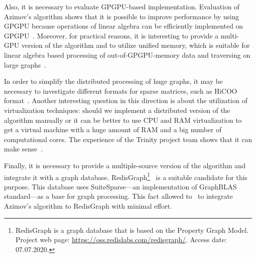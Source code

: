 Also, it is necessary to evaluate GPGPU-based implementation.
Evaluation of Azimov's algorithm shows that it is possible to improve performance by using GPGPU because operations of linear algebra can be efficiently implemented on GPGPU~\citep{Mishin:2019:ECP:3327964.3328503,10.1145/3398682.3399163}.
Moreover, for practical reasons, it is interesting to provide a multi-GPU version of the algorithm and to utilize unified memory, which is suitable for linear algebra based processing of out-of-GPGPU-memory data and traversing on large graphs~\citep{8946118,10.14778/3384345.3384358}.

In order to simplify the distributed processing of huge graphs, it may be necessary to investigate different formats for sparse matrices, such as HiCOO format~\citep{10.5555/3291656.3291682}.
Another interesting question in this direction is about the utilization of virtualization techniques: should we implement a distributed version of the algorithm manually or it can be better to use CPU and RAM virtualization to get a virtual machine with a huge amount of RAM and a big number of computational cores.
The experience of the Trinity project team shows that it can make sense~\citep{10.1145/2463676.2467799}.

Finally, it is necessary to provide a multiple-source version of the algorithm and integrate it with a graph database.
RedisGraph\footnote{RedisGraph is a graph database that is based on the Property Graph
Model. Project web page: \url{https://oss.redislabs.com/redisgraph/}. Access date:
07.07.2020.}~\citep{8778293} is a suitable candidate for this purpose.
This database uses SuiteSparse---an implementation of GraphBLAS standard---as a base for graph processing.
This fact allowed to~\cite{10.1145/3398682.3399163} to integrate Azimov's algorithm to RedisGraph with minimal effort.
